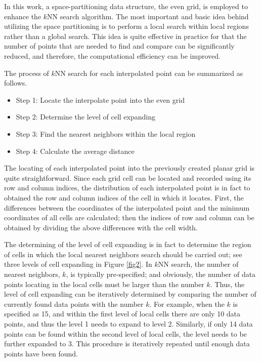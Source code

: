 \documentclass[final,5p,times,twocolumn,authoryear]{elsarticle}
\begin{document}
			In this work, a space-partitioning data structure, the even grid, is 
			employed to enhance the $k$NN search algorithm. The most important and basic 
			idea behind utilizing the space partitioning is to perform a local search 
			within local regions rather than a global search. This idea is quite 
			effective in practice for that the number of points that are needed to find 
			and compare can be significantly reduced, and therefore, the computational 
			efficiency can be improved.
			
			The process of $k$NN search for each interpolated point can be summarized as 
			follows.
			\begin{itemize}
				\item Step 1: Locate the interpolate point into the even grid
				\item Step 2: Determine the level of cell expanding
				\item Step 3: Find the nearest neighbors within the local region
				\item Step 4: Calculate the average distance
			\end{itemize}
			
			The locating of each interpolated point into the previously created planar 
			grid is quite straightforward. Since each grid cell can be located and 
			recorded using its row and column indices, the distribution of each 
			interpolated point is in fact to obtained the row and column indices of the 
			cell in which it locates. First, the differences between the coordinates of 
			the interpolated point and the minimum coordinates of all cells are 
			calculated; then the indices of row and column can be obtained by dividing 
			the above differences with the cell width.
			
			The determining of the level of cell expanding is in fact to determine the 
			region of cells in which the local nearest neighbors search should be 
			carried out; see three levels of cell expanding in Figure \ref{fig2}. In $k$NN search, 
			the number of nearest neighbors, $k$, is typically pre-specified; and 
			obviously, the number of data points locating in the local cells must be 
			larger than the number $k$. Thus, the level of cell expanding can be 
			iteratively determined by comparing the number of currently found data 
			points with the number $k$. For example, when the $k$ is specified as 15, and 
			within the first level of local cells there are only 10 data points, and 
			thus the level 1 needs to expand to level 2. Similarly, if only 14 data 
			points can be found within the second level of local cells, the level needs 
			to be further expanded to 3. This procedure is iteratively repeated until 
			enough data points have been found.
			
\end{document}
